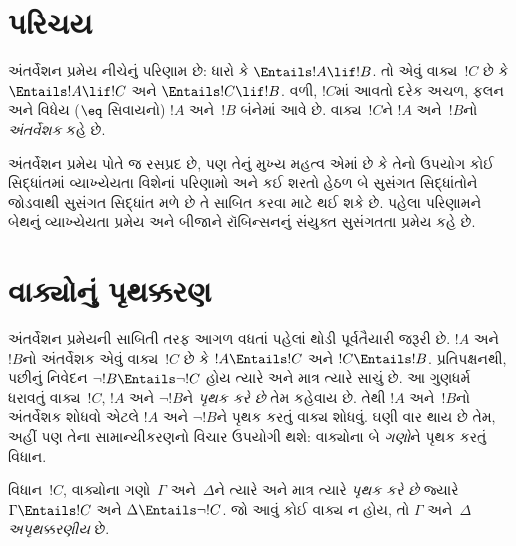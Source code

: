\OLEndChapterHook
\endgroup


\begingroup
\makeatletter{}\makeatother

\label{guunit:OLP-0198}


\begingroup
\makeatletter{}\makeatother


\section{પરિચય}
\label{guunit:OLP-0199}


અંતર્વેશન પ્રમેય નીચેનું પરિણામ છે: ધારો કે
$\Entails !A \lif !B$. તો એવું વાક્ય~$!C$ છે કે
$\Entails !A \lif !C$ અને $\Entails !C \lif !B$. વળી, $!C$માં આવતો
દરેક અચળ, ફલન અને વિધેય ($\eq$ સિવાયનો)
$!A$ અને~$!B$ બંનેમાં આવે છે. વાક્ય~$!C$ને $!A$ અને~$!B$નો
\emph{અંતર્વેશક} કહે છે.

અંતર્વેશન પ્રમેય પોતે જ રસપ્રદ છે, પણ તેનું મુખ્ય મહત્વ એમાં છે કે
તેનો ઉપયોગ કોઈ સિદ્ધાંતમાં વ્યાખ્યેયતા વિશેનાં પરિણામો અને કઈ
શરતો હેઠળ બે સુસંગત સિદ્ધાંતોને જોડવાથી સુસંગત સિદ્ધાંત મળે છે તે
સાબિત કરવા માટે થઈ શકે છે. પહેલા પરિણામને બેથનું વ્યાખ્યેયતા પ્રમેય
અને બીજાને રૉબિન્સનનું સંયુક્ત સુસંગતતા પ્રમેય કહે છે.
\endgroup


\begingroup
\makeatletter{}\makeatother


\section{વાક્યોનું પૃથક્કરણ}
\label{guunit:OLP-0200}


અંતર્વેશન પ્રમેયની સાબિતી તરફ આગળ વધતાં પહેલાં થોડી પૂર્વતૈયારી
જરૂરી છે. $!A$ અને~$!B$નો અંતર્વેશક એવું વાક્ય~$!C$ છે કે
$!A \Entails !C$ અને $!C \Entails !B$. પ્રતિપક્ષનથી, પછીનું નિવેદન
$\lnot !B \Entails \lnot !C$ હોય ત્યારે અને માત્ર ત્યારે સાચું છે.
આ ગુણધર્મ ધરાવતું વાક્ય~$!C$, $!A$ અને $\lnot !B$ને
\emph{પૃથક કરે છે} તેમ કહેવાય છે. તેથી $!A$ અને~$!B$નો અંતર્વેશક
શોધવો એટલે $!A$ અને $\lnot !B$ને પૃથક કરતું વાક્ય શોધવું.
ઘણી વાર થાય છે તેમ, અહીં પણ તેના સામાન્યીકરણનો વિચાર ઉપયોગી થશે:
વાક્યોના બે \emph{ગણો}ને પૃથક કરતું વિધાન.

\begin{defn}
વિધાન~$!C$, વાક્યોના ગણો~$\Gamma$ અને~$\Delta$ને ત્યારે અને
માત્ર ત્યારે \emph{પૃથક કરે છે} જ્યારે $\Gamma \Entails !C$ અને
$\Delta \Entails \lnot !C$. જો આવું કોઈ વાક્ય ન હોય, તો
$\Gamma$ અને~$\Delta$ \emph{અપૃથક્કરણીય} છે.
\end{defn}


